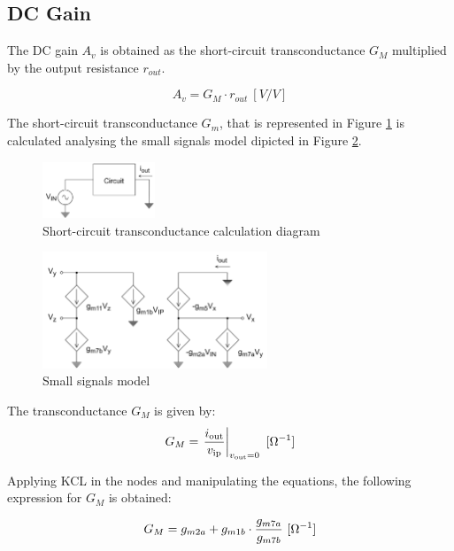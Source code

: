 \subsection {DC Gain}

The DC gain $A_v$ is obtained as the short-circuit transconductance $G_M$ multiplied by the output resistance $r_{out}$.

$$A_v = G_M \cdot r_{out}\ [V/V]$$

The short-circuit transconductance $G_m$, that is represented in Figure \ref{fig:cc_transconductance} is calculated analysing the small signals model dipicted in Figure \ref{fig:small_signals}.

\begin{figure}[H]
    \centering
    \includegraphics[width=0.3\textwidth]{Images/cc_transconductance.png}
    \caption{Short-circuit transconductance calculation diagram}
    \label{fig:cc_transconductance}
\end{figure}

\begin{figure}[H]
    \centering
    \includegraphics[width=0.6\textwidth]{Images/small_signals.png}
    \caption{Small signals model}
    \label{fig:small_signals}
\end{figure}

The transconductance $G_M$ is given by:
\begin{equation}
G_M = \left. \frac{i_{\text{out}}}{v_{\text{ip}}} \right|_{v_{\text{out}}=0} \ [\Omega ^{-1}] \\
\label{eq:Gm_general}
\end{equation}

Applying KCL in the nodes and manipulating the equations, the following expression for $G_M$ is obtained:

\begin{equation}
    G_M = g_{m2a} + g_{m1b} \cdot \frac{g_{m7a}}{g_{m7b}} \ [\Omega ^{-1}] \\
    \label{eq:GM_symbols}
\end{equation}

